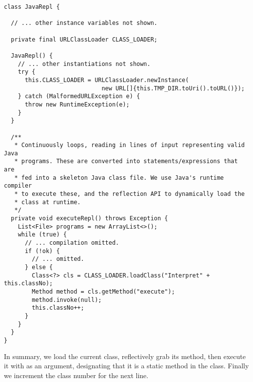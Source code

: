 \begin{lstlisting}[language=MyJava]
class JavaRepl {

  // ... other instance variables not shown.

  private final URLClassLoader CLASS_LOADER;

  JavaRepl() {
    // ... other instantiations not shown.
    try {
      this.CLASS_LOADER = URLClassLoader.newInstance(
                            new URL[]{this.TMP_DIR.toUri().toURL()});
    } catch (MalformedURLException e) {
      throw new RuntimeException(e);
    }
  }

  /**
   * Continuously loops, reading in lines of input representing valid Java
   * programs. These are converted into statements/expressions that are
   * fed into a skeleton Java class file. We use Java's runtime compiler 
   * to execute these, and the reflection API to dynamically load the 
   * class at runtime.
   */
  private void executeRepl() throws Exception {
    List<File> programs = new ArrayList<>();
    while (true) {
      // ... compilation omitted.
      if (!ok) {
        // ... omitted.
      } else {
        Class<?> cls = CLASS_LOADER.loadClass("Interpret" + this.classNo);
        Method method = cls.getMethod("execute");
        method.invoke(null);
        this.classNo++;
      }
    }
  }
}
\end{lstlisting}

In summary, we load the current class, reflectively grab its  method, then execute it with  as an argument, designating that it is a static method in the class. 
Finally we increment the class number for the next line.

